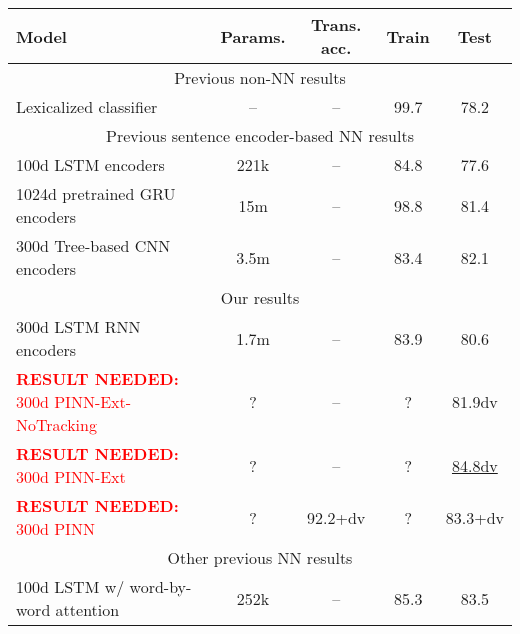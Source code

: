 \documentclass[11pt,letterpaper]{article}
\newcommand\result[1]{\textcolor{red}{\textbf{RESULT NEEDED:} #1}}
\begin{document}
\begin{table*}[t]
  \centering\small
  \begin{tabular}{lcccc} 
    \toprule
Model                   & Params.    & Trans. acc.  &   Train  &   Test \\
\midrule
\multicolumn{5}{c}{Previous non-NN results}\\
\midrule
Lexicalized classifier \cite{snli:emnlp2015}
                        & --                & --                    &   99.7   &   78.2      \\
\midrule
\multicolumn{5}{c}{Previous sentence encoder-based NN results}\\
\midrule
100d LSTM encoders \cite{snli:emnlp2015}
                        & 221k               & --               &   84.8   &   77.6      \\
1024d pretrained GRU encoders \cite{DBLP:journals/corr/VendrovKFU15}
                        & 15m                & --              &   98.8   &   81.4       \\
300d Tree-based CNN encoders \cite{mou2015recognizing}
                        & 3.5m                & --             &   83.4   &   82.1       \\
\midrule
\multicolumn{5}{c}{Our results}\\
\midrule
300d LSTM RNN encoders          & 1.7m                  & --                &   83.9      &   80.6       \\
\result{300d PINN-Ext-NoTracking}   
                        & ?                  & --                &   ?      &   81.9dv       \\
\result{300d PINN-Ext }
                        & ?                  & --                &   ?      &   \underline{84.8dv}       \\
\result{300d PINN }
                        & ?                  & 92.2+dv            &   ?    &   83.3+dv       \\          
\midrule
\multicolumn{5}{c}{Other previous NN results}\\
\midrule
100d LSTM w/ word-by-word attention \cite{rocktaschel2015reasoning}
                        & 252k               & --              &   85.3   &   83.5       \\

\end{tabular}
\end{table*}
\end{document}
